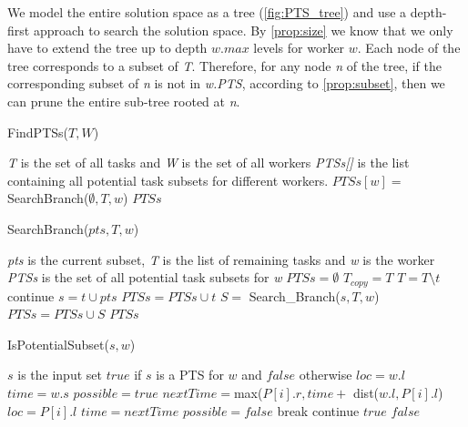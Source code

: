 We model the entire solution space as a tree (\cref{fig:PTS_tree}) and use a depth-first approach to search the solution space. By \cref{prop:size} we know that we only have to extend the tree up to depth $w.max$ levels for worker $w$. Each node of the tree corresponds to a subset of \emph{T}. Therefore, for any node \emph{n} of the tree, if the corresponding subset of \emph{n} is not in \emph{w.PTS}, according to \cref{prop:subset}, then we can prune the entire sub-tree rooted at \emph{n}.

\begin{algorithm}[h]
\caption{FindPTSs($T, W$)}
\label{algo:FindPTS}
\begin{algorithmic}[1]
\REQUIRE \emph{T} is the set of all tasks and \emph{W} is the set of all workers
\ENSURE \emph{PTSs[]} is the list containing all potential task subsets for different workers.
	\STATE $PTSs[w] = $ SearchBranch($\emptyset, T, w$)
\ENDFOR
\RETURN $PTSs$
\end{algorithmic}
\end{algorithm}

\begin{algorithm}[t]
\caption{SearchBranch($pts, T, w$)}
\label{algo:SearchBranch}
\begin{algorithmic}[1]
\REQUIRE \emph{pts} is the current subset, \emph{T} is the list of remaining tasks and \emph{w} is the worker
\ENSURE \emph{PTSs} is the set of all potential task subsets for \emph{w}
\STATE $PTSs = \emptyset$
\STATE $T_{copy} = T$
	\STATE $T = T \setminus t$
		\STATE continue
	\ENDIF
	\STATE $s = t \cup pts$
		\STATE $PTSs = PTSs \cup t$
			\STATE $S =$ Search\_Branch($s, T, w$)
			\STATE $PTSs = PTSs \cup S$
		\ENDIF
	\ENDIF
\ENDFOR
\RETURN $PTSs$
\end{algorithmic}
\end{algorithm}

\begin{algorithm}[t]
\caption{IsPotentialSubset($s, w$)}
\label{algo:IsPTS}
\begin{algorithmic}[1]
\REQUIRE $s$ is the input set
\ENSURE $true$ if $s$ is a PTS for $w$ and $false$ otherwise
\STATE $loc = w.l$
\STATE $time = w.s$
	\STATE $possible = true$
		\STATE $nextTime = $max($P[i].r, time +$ dist($w.l, P[i].l$)
			\STATE $loc = P[i].l$
			\STATE $time = nextTime$
		\ELSE
			\STATE $possible = false$
			\STATE break
		\ENDIF
	\ENDFOR
		\STATE continue
	\ELSE
		\RETURN $true$
	\ENDIF
\ENDFOR
\RETURN $false$
\end{algorithmic}
\end{algorithm}

